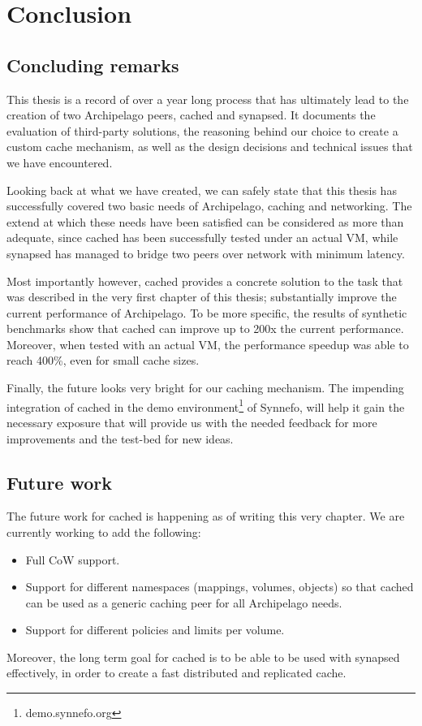 \chapter{Conclusion}\label{ch:future}

\section{Concluding remarks}

This thesis is a record of over a year long process that has ultimately lead to 
the creation of two Archipelago peers, cached and synapsed. It documents the 
evaluation of third-party solutions, the reasoning behind our choice to create 
a custom cache mechanism, as well as the design decisions and technical issues 
that we have encountered.

Looking back at what we have created, we can safely state that this thesis has 
successfully covered two basic needs of Archipelago, caching and networking.  
The extend at which these needs have been satisfied can be considered as more 
than adequate, since cached has been successfully tested under an actual VM, 
while synapsed has managed to bridge two peers over network with minimum 
latency.

Most importantly however, cached provides a concrete solution to the task that 
was described in the very first chapter of this thesis; substantially improve 
the current performance of Archipelago.  To be more specific, the results of 
synthetic benchmarks show that cached can improve up to 200x the current 
performance.  Moreover, when tested with an actual VM, the performance speedup 
was able to reach 400\%, even for small cache sizes.

Finally, the future looks very bright for our caching mechanism. The impending 
integration of cached in the demo environment\footnote{demo.synnefo.org}
of Synnefo, will help it gain the necessary exposure that will provide us with 
the needed feedback for more improvements and the test-bed for new ideas.

\section{Future work}

The future work for cached is happening as of writing this very chapter. We are 
currently working to add the following:

\begin{itemize}
	\item Full CoW support.
	\item Support for different namespaces (mappings, volumes, objects) so 
		that cached can be used as a generic caching peer for all 
		Archipelago needs.
	\item Support for different policies and limits per volume.
\end{itemize}

Moreover, the long term goal for cached is to be able to be used with synapsed 
effectively, in order to create a fast distributed and replicated cache.
